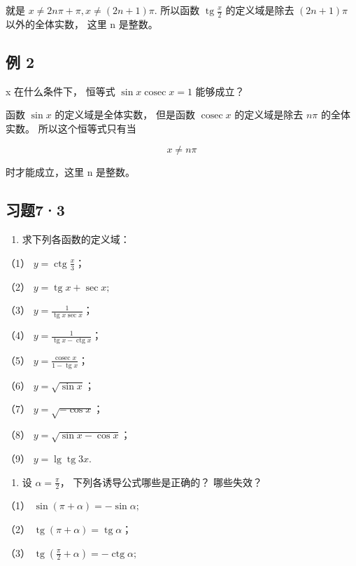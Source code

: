 就是 \(x \neq 2n\pi + \pi, x \neq (2n + 1)\pi.\) 所以函数
\(\operatorname{tg} \frac{x}{2}\) 的定义域是除去 \((2n + 1)\pi\)
以外的全体实数， 这里 n 是整数。

\subsection{例 2}

x 在什么条件下， 恒等式 \(\sin x\operatorname{cosec}x=1\) 能够成立？

 函数 \(\sin x\) 的定义域是全体实数， 但是函数
\(\operatorname{cosec}x\) 的定义域是除去 \(n\pi\) 的全体实数。
所以这个恒等式只有当

\[
x \neq n \pi
\]

时才能成立，这里 n 是整数。

\subsection{习题7·3}

\begin{enumerate}
\item
  求下列各函数的定义域：
\end{enumerate}

（1） \(y = \operatorname{ctg} \frac{x}{3}\)；

（2） \(y = \operatorname{tg} x + \sec x;\)

（3） \(y = \frac{1}{\operatorname{tg} x \sec x}\)；

（4） \(y = \frac{1}{\operatorname{tg} x - \operatorname{ctg} x}\)；

（5） \(y = \frac{\operatorname{cosec} x}{1 - \operatorname{tg} x}\)；

（6） \(y = \sqrt{\sin x}\)；

（7） \(y = \sqrt{-\cos x}\)；

（8） \(y = \sqrt{\sin x - \cos x}\)；

（9） \(y = \lg \operatorname{tg} 3x.\)

\begin{enumerate}[start=2]
\item
  设 \(\alpha = \frac{\pi}{2}\)， 下列各诱导公式哪些是正确的？
  哪些失效？
\end{enumerate}

（1） \(\sin (\pi +\alpha) = -\sin \alpha ;\)

（2） \(\operatorname{tg}(\pi + \alpha) = \operatorname{tg} \alpha\)；

（3）
\(\operatorname{tg}\left(\frac{\pi}{2} + \alpha\right) = -\operatorname{ctg}\alpha;\)

